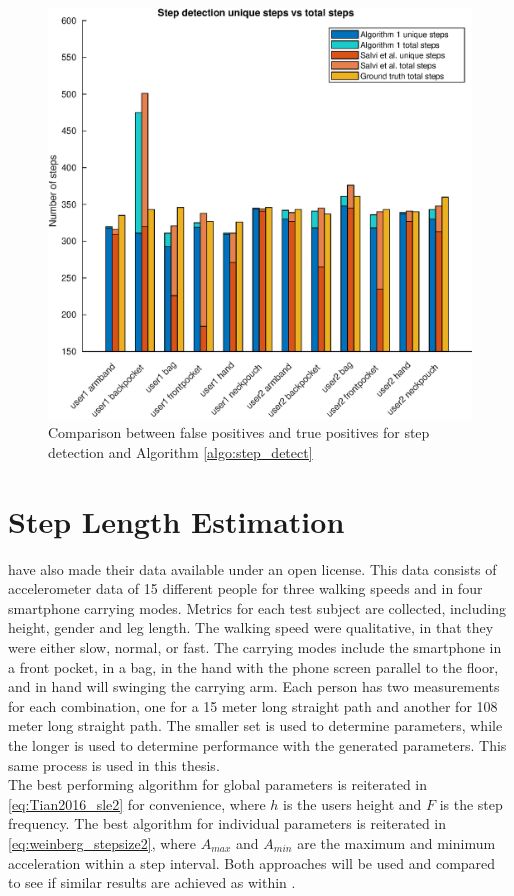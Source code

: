 \begin{figure}[H]
	\centering
	\includegraphics[width=0.7\linewidth]{images/20201112_1857_Step_detection_unique_steps_vs_total_steps_}
	\setlength{\belowcaptionskip}{-20pt}
\caption[False positives and true positives step detection comparison]{Comparison between false positives and true positives for \citet{Salvi2018} step detection and Algorithm \ref{algo:step_detect}}
\label{fig:sd_tp_fp_comparison}
\end{figure}

\section{Step Length Estimation}

\citet{Vezocnik2019} have also made their data available under an open license. This data consists of accelerometer data of 15 different people for three walking speeds and in four smartphone carrying modes. Metrics for each test subject are collected, including height, gender and leg length. The walking speed were qualitative, in that they were either slow, normal, or fast. The carrying modes include the smartphone in a front pocket, in a bag, in the hand with the phone screen parallel to the floor, and in hand will swinging the carrying arm. Each person has two measurements for each combination, one for a 15 meter long straight path and another for 108 meter long straight path. The smaller set is used to determine parameters, while the longer is used to determine performance with the generated parameters. This same process is used in this thesis.\\
The best performing algorithm for global parameters is reiterated in \eqref{eq:Tian2016_sle2} for convenience, where $h$ is the users height and $F$ is the step frequency. The best algorithm for individual parameters is reiterated in  \eqref{eq:weinberg_stepsize2}, where $A_{max}$ and $A_{min}$ are the maximum and minimum acceleration within a step interval. Both approaches will be used and compared to see if similar results are achieved as within \cite{Vezocnik2019}.

